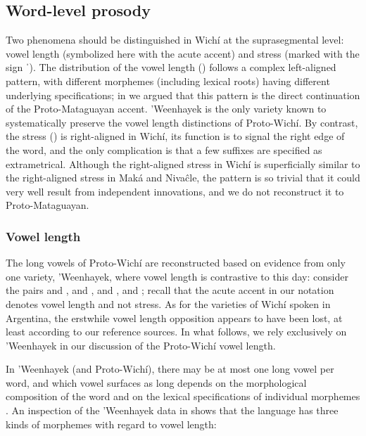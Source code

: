\subsection{Word-level prosody}\label{wi-prosody}

Two phenomena should be distinguished in Wichí at the suprasegmental level: vowel length (symbolized here with the acute accent) and stress (marked with the sign ˈ). The distribution of the vowel length () follows a complex left-aligned pattern, with different morphemes (including lexical roots) having different underlying specifications; in  we argued that this pattern is the direct continuation of the Proto-Mataguayan accent. 'Weenhayek is the only variety known to systematically preserve the vowel length distinctions of Proto-Wichí. By contrast, the stress () is right-aligned in Wichí, its function is to signal the right edge of the word, and the only complication is that a few suffixes are specified as extrametrical. Although the right-aligned stress in Wichí is superficially similar to the right-aligned stress in Maká and Nivaĉle, the pattern is so trivial that it could very well result from independent innovations, and we do not reconstruct it to Proto-Mataguayan.

\subsubsection{Vowel length}\label{wi-length}

The long vowels of Proto-Wichí are reconstructed based on evidence from only one variety, 'Weenhayek, where vowel length is contrastive to this day: consider the pairs  and ,  and ,  and ,  and  \citep[24]{KCnd}; recall that the acute accent in our notation denotes vowel length and not stress. As for the varieties of Wichí spoken in Argentina, the erstwhile vowel length opposition appears to have been lost, at least according to our reference sources. In what follows, we rely exclusively on 'Weenhayek in our discussion of the Proto-Wichí vowel length.

In 'Weenhayek (and Proto-Wichí), there may be at most one long vowel per word, and which vowel surfaces as long depends on the morphological composition of the word and on the lexical specifications of individual morphemes \citep[24--30]{KCnd}. An inspection of the 'Weenhayek data in \citet{KC16} shows that the language has three kinds of morphemes with regard to vowel length:


